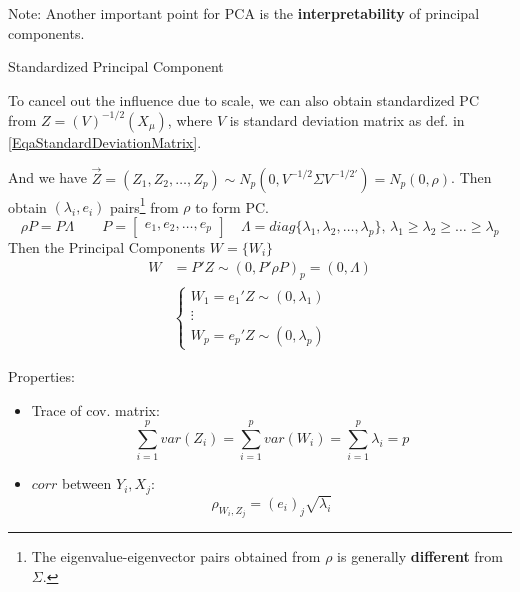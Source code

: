     

    Note: Another important point for PCA is the \textbf{interpretability} of principal components.

    \begin{point}
        Standardized Principal Component
    \end{point}

    To cancel out the influence due to scale, we can also obtain standardized PC from $ Z=(V)^{-1/2}(X_\mu) $, where $ V $ is standard deviation matrix as def. in \autoref{EqaStandardDeviationMatrix}.

    And we have $ \vec{Z}=(Z_{1},Z_{2},\ldots,Z_{p}) \sim N_p(0,V^{-1/2}\Sigma V^{-1/2\prime})=N_p(0,\rho ) $. Then obtain $ (\lambda _i,e_i) $ pairs\footnote{The eigenvalue-eigenvector pairs obtained from $ \rho  $ is generally \textbf{different}  from $ \Sigma  $.} from $ \rho  $ to form PC.
    \begin{equation}
        \rho  P=P\Lambda \qquad P=\begin{bmatrix}
            e_1,e_2,\ldots,e_p
        \end{bmatrix} 
        \quad \Lambda =diag\{\lambda _1,\lambda _2,\ldots,\lambda _p\},\, \lambda _1\geq\lambda _2\geq\ldots\geq\lambda _p
    \end{equation}
    Then the Principal Components $ W=\{W_i\} $ 
    \begin{align}
        W&=P'Z\sim (0,P'\rho  P)_p=(0,\Lambda  )\\
        &\begin{cases}
            W_1=e_1'Z\sim (0,\lambda _1)\\
            \vdots\\
            W_p=e_p'Z\sim (0,\lambda _p)
        \end{cases}
    \end{align}

    Properties:
    \begin{itemize}[topsep=2pt,itemsep=2pt]
        \item Trace of cov. matrix:
        \begin{equation}
            \sum_{i=1}^pvar(Z_i)=\sum_{i=1}^pvar(W_i)=\sum_{i=1}^p\lambda_i=p
        \end{equation}
        \item $ corr $ between $ Y_i,X_j $:
        \begin{equation}
            \rho_{W_i,Z_j}=(e_{i})_j\sqrt{\lambda _i}
        \end{equation}     
    \end{itemize}
    



